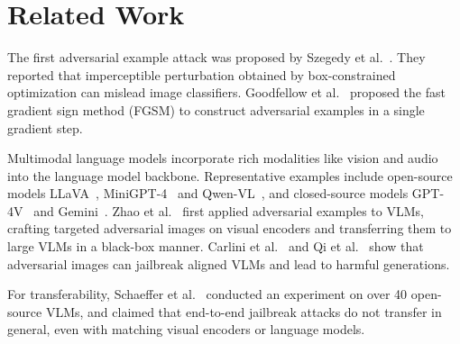 \documentclass{article}
\begin{document}
\section{Related Work}

The first adversarial example attack was proposed by Szegedy et al.~\cite{Szegedy2014Intriguing}. They reported that imperceptible perturbation obtained by box-constrained optimization can mislead image classifiers. 
Goodfellow et al.~\cite{Goodfellow2015FGSM} proposed the fast gradient sign method (FGSM) to construct adversarial examples in a single gradient step.

Multimodal language models incorporate rich modalities like vision and audio into the language model backbone. Representative examples include open-source models LLaVA~\cite{Liu2024LLaVA15}, MiniGPT-4~\cite{Zhu2024MiniGPT4} and Qwen-VL~\cite{Bai2023QwenVL}, and closed-source models GPT-4V~\cite{OpenAI2023GPT4} and Gemini~\cite{Gemini2023}.
Zhao et al.~\cite{Zhao2023EvalAdvVLM} first applied adversarial examples to VLMs, crafting targeted adversarial images on visual encoders and transferring them to large VLMs in a black-box manner.
Carlini et al.~\cite{Carlini2023Aligned} and Qi et al.~\cite{Qi2024VisualJailbreak} show that adversarial images can jailbreak aligned VLMs and lead to harmful generations.


For transferability, Schaeffer et al.~\cite{Schaeffer2025} conducted an experiment on over 40 open-source VLMs, and claimed that end-to-end jailbreak attacks do not transfer in general, even with matching visual encoders or language models.



\end{document}

